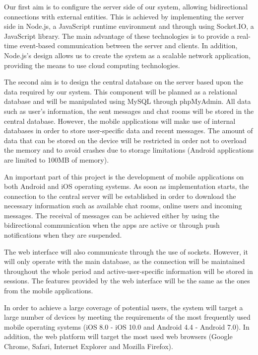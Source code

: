 \documentclass{article}
\begin{document}
	Our first aim is to configure the server side of our system, allowing bidirectional connections with external entities. This is achieved by implementing the server side in Node.js, a JavaScript runtime environment and through using Socket.IO, a JavaScript library. The main advantage of these technologies is to provide a real-time event-based communication between the server and clients. In addition, Node.js's design allows us to create the system as a scalable network application, providing the means to use cloud computing technologies. \\\par
	The second aim is to design the central database on the server based upon the data required by our system. This component will be planned as a relational database and will be manipulated using MySQL through phpMyAdmin. All data such as user's information, the sent messages and chat rooms will be stored in the central database. However, the mobile applications will make use of internal databases in order to store user-specific data and recent messages. The amount of data that can be stored on the device will be restricted in order not to overload the memory and to avoid crashes due to storage limitations (Android applications are limited to 100MB of memory).\\\par
	An important part of this project is the development of mobile applications on both Android and iOS operating systems. As soon as implementation starts, the connection to the central server will be established in order to download the necessary information such as available chat rooms, online users and incoming messages. The receival of messages can be achieved either by using the bidirectional communication when the apps are active or through push notifications when they are suspended. \\\par
	The web interface will also communicate through the use of sockets. However, it will only operate with the main database, as the connection will be maintained throughout the whole period and active-user-specific information will be stored in sessions. The features provided by the web interface will be the same as the ones from the mobile applications. \\\par
	In order to achieve a large coverage of potential users, the system will target a large number of devices by meeting the requirements of the most frequently used mobile operating systems (iOS 8.0 - iOS 10.0 and Android 4.4 - Android 7.0). In addition, the web platform will target the most used web browsers (Google Chrome, Safari, Internet Explorer and Mozilla Firefox). \\\par
\end{document}
